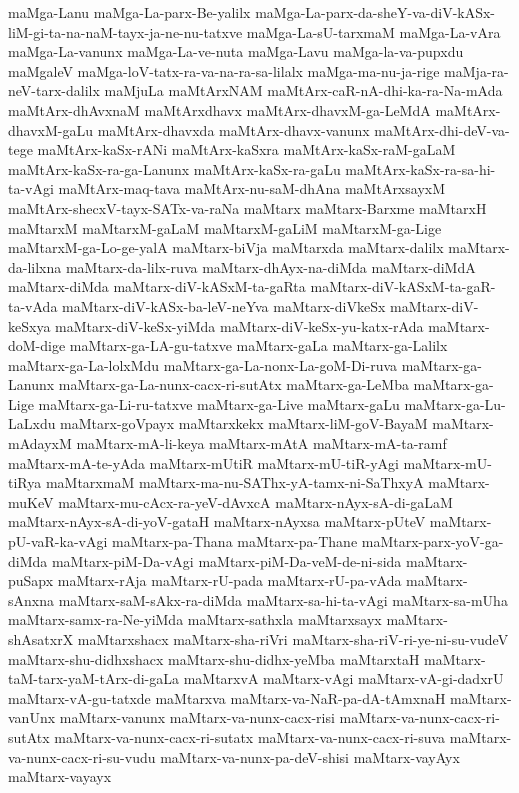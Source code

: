 {maMga-Lanu
maMga-La-parx-Be-yalilx
maMga-La-parx-da-sheY-va-diV-kASx-liM-gi-ta-na-naM-tayx-ja-ne-nu-tatxve
maMga-La-sU-tarxmaM
maMga-La-vAra
maMga-La-vanunx
maMga-La-ve-nuta
maMga-Lavu
maMga-la-va-pupxdu
maMgaleV
maMga-loV-tatx-ra-va-na-ra-sa-lilalx
maMga-ma-nu-ja-rige
maMja-ra-neV-tarx-dalilx
maMjuLa
maMtArxNAM
maMtArx-caR-nA-dhi-ka-ra-Na-mAda
maMtArx-dhAvxnaM
maMtArxdhavx
maMtArx-dhavxM-ga-LeMdA
maMtArx-dhavxM-gaLu
maMtArx-dhavxda
maMtArx-dhavx-vanunx
maMtArx-dhi-deV-va-tege
maMtArx-kaSx-rANi
maMtArx-kaSxra
maMtArx-kaSx-raM-gaLaM
maMtArx-kaSx-ra-ga-Lanunx
maMtArx-kaSx-ra-gaLu
maMtArx-kaSx-ra-sa-hi-ta-vAgi
maMtArx-maq-tava
maMtArx-nu-saM-dhAna
maMtArxsayxM
maMtArx-shecxV-tayx-SATx-va-raNa
maMtarx
maMtarx-Barxme
maMtarxH
maMtarxM
maMtarxM-gaLaM
maMtarxM-gaLiM
maMtarxM-ga-Lige
maMtarxM-ga-Lo-ge-yalA
maMtarx-biVja
maMtarxda
maMtarx-dalilx
maMtarx-da-lilxna
maMtarx-da-lilx-ruva
maMtarx-dhAyx-na-diMda
maMtarx-diMdA
maMtarx-diMda
maMtarx-diV-kASxM-ta-gaRta
maMtarx-diV-kASxM-ta-gaR-ta-vAda
maMtarx-diV-kASx-ba-leV-neYva
maMtarx-diVkeSx
maMtarx-diV-keSxya
maMtarx-diV-keSx-yiMda
maMtarx-diV-keSx-yu-katx-rAda
maMtarx-doM-dige
maMtarx-ga-LA-gu-tatxve
maMtarx-gaLa
maMtarx-ga-Lalilx
maMtarx-ga-La-lolxMdu
maMtarx-ga-La-nonx-La-goM-Di-ruva
maMtarx-ga-Lanunx
maMtarx-ga-La-nunx-cacx-ri-sutAtx
maMtarx-ga-LeMba
maMtarx-ga-Lige
maMtarx-ga-Li-ru-tatxve
maMtarx-ga-Live
maMtarx-gaLu
maMtarx-ga-Lu-LaLxdu
maMtarx-goVpayx
maMtarxkekx
maMtarx-liM-goV-BayaM
maMtarx-mAdayxM
maMtarx-mA-li-keya
maMtarx-mAtA
maMtarx-mA-ta-ramf
maMtarx-mA-te-yAda
maMtarx-mUtiR
maMtarx-mU-tiR-yAgi
maMtarx-mU-tiRya
maMtarxmaM
maMtarx-ma-nu-SAThx-yA-tamx-ni-SaThxyA
maMtarx-muKeV
maMtarx-mu-cAcx-ra-yeV-dAvxcA
maMtarx-nAyx-sA-di-gaLaM
maMtarx-nAyx-sA-di-yoV-gataH
maMtarx-nAyxsa
maMtarx-pUteV
maMtarx-pU-vaR-ka-vAgi
maMtarx-pa-Thana
maMtarx-pa-Thane
maMtarx-parx-yoV-ga-diMda
maMtarx-piM-Da-vAgi
maMtarx-piM-Da-veM-de-ni-sida
maMtarx-puSapx
maMtarx-rAja
maMtarx-rU-pada
maMtarx-rU-pa-vAda
maMtarx-sAnxna
maMtarx-saM-sAkx-ra-diMda
maMtarx-sa-hi-ta-vAgi
maMtarx-sa-mUha
maMtarx-samx-ra-Ne-yiMda
maMtarx-sathxla
maMtarxsayx
maMtarx-shAsatxrX
maMtarxshacx
maMtarx-sha-riVri
maMtarx-sha-riV-ri-ye-ni-su-vudeV
maMtarx-shu-didhxshacx
maMtarx-shu-didhx-yeMba
maMtarxtaH
maMtarx-taM-tarx-yaM-tArx-di-gaLa
maMtarxvA
maMtarx-vAgi
maMtarx-vA-gi-dadxrU
maMtarx-vA-gu-tatxde
maMtarxva
maMtarx-va-NaR-pa-dA-tAmxnaH
maMtarx-vanUnx
maMtarx-vanunx
maMtarx-va-nunx-cacx-risi
maMtarx-va-nunx-cacx-ri-sutAtx
maMtarx-va-nunx-cacx-ri-sutatx
maMtarx-va-nunx-cacx-ri-suva
maMtarx-va-nunx-cacx-ri-su-vudu
maMtarx-va-nunx-pa-deV-shisi
maMtarx-vayAyx
maMtarx-vayayx
}
